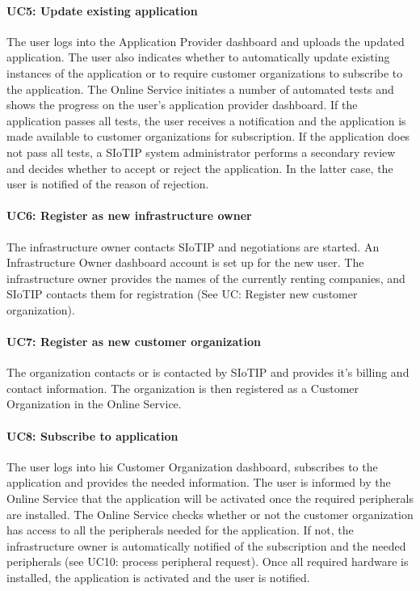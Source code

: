 \documentclass[english,peerreview]{sareport}
\begin{document}
\paragraph{UC5: Update existing application}
The user logs into the Application Provider dashboard and uploads the updated application. The user also indicates whether to automatically update existing instances of the application or to require customer organizations to subscribe to the application. The Online Service initiates a number of automated tests and shows the progress on the user's application provider dashboard. If the application passes all tests, the user receives a notification and the application is made available to customer organizations for subscription. If the application does not pass all tests, a SIoTIP system administrator performs a secondary review and decides whether to accept or reject the application. In the latter case, the user is notified of the reason of rejection.

\paragraph{UC6: Register as new infrastructure owner}
The infrastructure owner contacts SIoTIP and negotiations are started. An Infrastructure Owner dashboard account is set up for the new user. The infrastructure owner provides the names of the currently renting companies, and SIoTIP contacts them for registration (See UC: Register new customer organization).

\paragraph{UC7: Register as new customer organization}
The organization contacts or is contacted by SIoTIP and provides it's billing and contact information. The organization is then registered as a Customer Organization in the Online Service.

\paragraph{UC8: Subscribe to application}
The user logs into his Customer Organization dashboard, subscribes to the application and provides the needed information. The user is informed by the Online Service that the application will be activated once the required peripherals are installed. The Online Service checks whether or not the customer organization has access to all the peripherals needed for the application. If not, the infrastructure owner is automatically notified of the subscription and the needed peripherals (see UC10: process peripheral request). Once all required hardware is installed, the application is activated and the user is notified.
\end{document}
